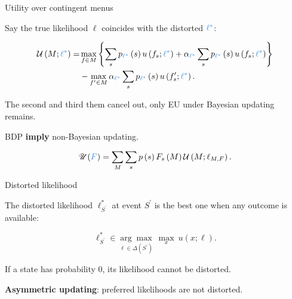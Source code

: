 \documentclass[usenames,dvipsnames,aspectratio=169,11pt, envcountsect, handout]{beamer}
\begin{document}
\begin{frame}[noframenumbering]{Utility over contingent menus}

	Say the true likelihood \( \ell \) coincides with the distorted \( \textcolor{blue}{\ell^{*}} \):

	\vfill

	\[
		\begin{aligned}
			\mathcal{U} \left(M ; \textcolor{blue}{\ell^{*}} \right) = & \max _{f \in M}\left\{\sum_{s} p_{\textcolor{blue}{\ell^{*}}} \left( s \right) u \left( f_{s} ; \textcolor{blue}{\ell^{*}} \right) + \alpha_{\textcolor{blue}{\ell^{*}}} \sum_{s} p_{\textcolor{blue}{\ell^{*}}} \left( s \right) u \left( f_{s} ; \textcolor{blue}{\ell^{*}} \right) \right\} \\
			                                                           & -\max _{f^{\prime} \in M} \alpha _{\textcolor{blue}{\ell^{*}}} \sum_{s} p_{\textcolor{blue}{\ell^{*}}} \left( s \right) u\left(f^{\prime}_{s} ; \textcolor{blue}{\ell^{*}} \right) .
		\end{aligned}
	\]

	\vfill

	The second and third them cancel out, only EU under Bayesian updating remains.

	\vfill

	BDP \textbf{imply} non-Bayesian updating.

		{\begingroup
			\[
				\mathscr{U}(\textcolor{blue}{F})= \sum_{M} \sum_{s} p \left( s \right) F_{s} \left( M \right) \mathcal{U} \left(M ; \ell_{M, F} \right) .
			\]

			\endgroup}

\end{frame}

\begin{frame}{Distorted likelihood}

	The distorted likelihood \( \ell^{*}_{S^{\prime}} \) at event \( S^{\prime} \) is the best one when any outcome is available:

	\vfill

	\[
		\ell^{*}_{S^{\prime}} \in \underset{\ell \in \Delta \left( S^{\prime} \right) }{\arg \max} \: \max_{ x } \: u \left( x ; \ell \right) .
	\] \pause

	\vfill

	If a state has probability \( 0 \), its likelihood cannot be distorted. \pause

	\vfill

	\textbf{Asymmetric updating}: preferred likelihoods are not distorted.

\end{frame}
\end{document}
